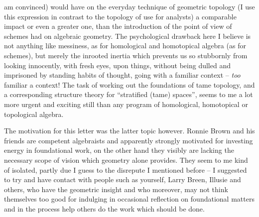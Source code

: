 am convinced) would have on the everyday technique of geometric
topology (I use this expression in contrast to the topology of use for
analysts) a comparable impact or even a greater one, than the
introduction of the point of view of schemes had on algebraic
geometry. The psychological drawback here I believe is not anything
like messiness, as for homological and homotopical algebra (as for
schemes), but merely the inrooted inertia which prevents us so
stubbornly from looking innocently, with fresh eyes, upon things,
without being dulled and imprisoned by standing habits of thought,
going with a familiar context -- \emph{too} familiar a context! The
task of working out the foundations of tame topology, and a
corresponding structure theory for ``stratified (tame) spaces'', seems
to me a lot more urgent and exciting still
than any program of homological,
homotopical or topological algebra.

\label{sec:2}%
The motivation for this letter was the latter topic
however. Ronnie Brown and his friends are competent algebraists and
apparently strongly motivated for investing energy in foundational
work, on the other hand they visibly are lacking the necessary scope
of vision which geometry alone provides. They seem to me kind of
isolated, partly due I guess to the disrepute I mentioned before -- I
suggested to try and have contact with people such as yourself, Larry
Breen, Illusie and others, who have the geometric insight and who
moreover, may not think themselves too good for indulging in
occasional reflection on foundational matters and in the process help
others do the work which should be done.

